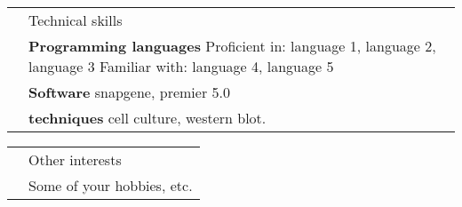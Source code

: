 \documentclass[letterpaper, 11pt]{article}
\newcommand{\headingfont}{\Large\color{OliveGreen}}
\newenvironment{SectionTable}[1]{
	\renewcommand*{\arraystretch}{1.7}
	\setlength{\tabcolsep}{10pt}
	\begin{longtable}{Rp{5.2in}} & #1 \\}
{\end{longtable}\vspace{-.3cm}}
\begin{document}
\begin{SectionTable}{\headingfont Technical skills}
& \textbf{Programming languages} \newline
Proficient in: language 1, language 2, language 3 \newline
Familiar with: language 4, language 5 \\

& \textbf{Software} \newline
snapgene, premier 5.0 \\

& \textbf{techniques} \newline
cell culture, western blot.
\end{SectionTable}


\begin{SectionTable}{\headingfont Other interests}
& Some of your hobbies, etc.
\end{SectionTable}

\end{document}
